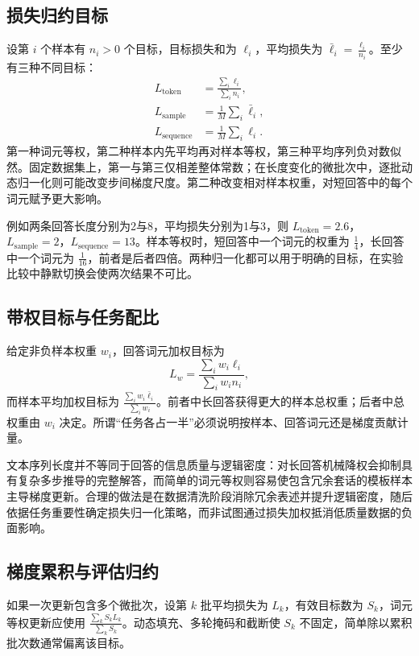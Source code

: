 \documentclass[../textbook.tex]{subfiles}
\begin{document}
\subsection{损失归约目标}
设第 $i$ 个样本有 $n_i>0$ 个目标，目标损失和为 $\ell_i$，平均损失为 $\bar\ell_i=\frac{\ell_i}{n_i}$。至少有三种不同目标：
\begin{align}
 L_{\mathrm{token}}&=\frac{\sum_i\ell_i}{\sum_i n_i},\\
 L_{\mathrm{sample}}&=\frac1M\sum_i\bar\ell_i,\\
 L_{\mathrm{sequence}}&=\frac1M\sum_i\ell_i.
 \label{eq:sft-reductions}
\end{align}
第一种词元等权，第二种样本内先平均再对样本等权，第三种平均序列负对数似然。固定数据集上，第一与第三仅相差整体常数；在长度变化的微批次中，逐批动态归一化则可能改变步间梯度尺度。第二种改变相对样本权重，对短回答中的每个词元赋予更大影响。

例如两条回答长度分别为2与8，平均损失分别为1与3，则 $L_{\mathrm{token}}=2.6$，$L_{\mathrm{sample}}=2$，$L_{\mathrm{sequence}}=13$。样本等权时，短回答中一个词元的权重为 $\frac{1}{4}$，长回答中一个词元为 $\frac{1}{16}$，前者是后者四倍。两种归一化都可以用于明确的目标，在实验比较中静默切换会使两次结果不可比。

\subsection{带权目标与任务配比}
给定非负样本权重 $w_i$，回答词元加权目标为
\begin{equation}
 L_w=\frac{\sum_iw_i\ell_i}{\sum_iw_in_i},
\end{equation}
而样本平均加权目标为 $\frac{\sum_iw_i\bar\ell_i}{\sum_iw_i}$。前者中长回答获得更大的样本总权重；后者中总权重由 $w_i$ 决定。所谓“任务各占一半”必须说明按样本、回答词元还是梯度贡献计量。

文本序列长度并不等同于回答的信息质量与逻辑密度：对长回答机械降权会抑制具有复杂多步推导的完整解答，而简单的词元等权则容易使包含冗余套话的模板样本主导梯度更新。合理的做法是在数据清洗阶段消除冗余表述并提升逻辑密度，随后依据任务重要性确定损失归一化策略，而非试图通过损失加权抵消低质量数据的负面影响。

\subsection{梯度累积与评估归约}
如果一次更新包含多个微批次，设第 $k$ 批平均损失为 $L_k$，有效目标数为 $S_k$，词元等权更新应使用 $\frac{\sum_kS_kL_k}{\sum_kS_k}$。动态填充、多轮掩码和截断使 $S_k$ 不固定，简单除以累积批次数通常偏离该目标。
\end{document}
